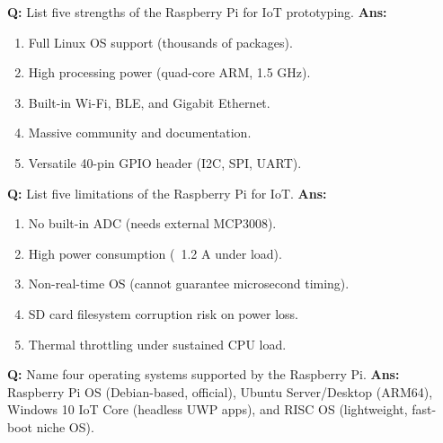 \documentclass[10pt,a4paper,twocolumn]{article}
\begin{document}
\begin{tcolorbox}[
  colback=white,
  colframe=UnitColorSix,
  colbacktitle=gray!10!white,
  coltitle=black,
  fonttitle=\bfseries\sffamily\small,
  title={Unit VI $\bullet$ Card 4},
  boxrule=1.2pt,
  arc=2mm,
  outer arc=2mm,
  boxsep=1.5mm,
  top=1mm,
  bottom=1mm,
  left=1.5mm,
  right=1.5mm,
  before skip=2.5mm,
  after skip=2.5mm
]
\textbf{Q:} List five strengths of the Raspberry Pi for IoT prototyping.
\tcbline
\textbf{Ans:} \begin{enumerate}
  \item Full Linux OS support (thousands of packages).
  \item High processing power (quad-core ARM, 1.5 GHz).
  \item Built-in Wi-Fi, BLE, and Gigabit Ethernet.
  \item Massive community and documentation.
  \item Versatile 40-pin GPIO header (I2C, SPI, UART).
\end{enumerate}
\end{tcolorbox}


\begin{tcolorbox}[
  colback=white,
  colframe=UnitColorSix,
  colbacktitle=gray!10!white,
  coltitle=black,
  fonttitle=\bfseries\sffamily\small,
  title={Unit VI $\bullet$ Card 5},
  boxrule=1.2pt,
  arc=2mm,
  outer arc=2mm,
  boxsep=1.5mm,
  top=1mm,
  bottom=1mm,
  left=1.5mm,
  right=1.5mm,
  before skip=2.5mm,
  after skip=2.5mm
]
\textbf{Q:} List five limitations of the Raspberry Pi for IoT.
\tcbline
\textbf{Ans:} \begin{enumerate}
  \item No built-in ADC (needs external MCP3008).
  \item High power consumption (~1.2 A under load).
  \item Non-real-time OS (cannot guarantee microsecond timing).
  \item SD card filesystem corruption risk on power loss.
  \item Thermal throttling under sustained CPU load.
\end{enumerate}
\end{tcolorbox}


\begin{tcolorbox}[
  colback=white,
  colframe=UnitColorSix,
  colbacktitle=gray!10!white,
  coltitle=black,
  fonttitle=\bfseries\sffamily\small,
  title={Unit VI $\bullet$ Card 6},
  boxrule=1.2pt,
  arc=2mm,
  outer arc=2mm,
  boxsep=1.5mm,
  top=1mm,
  bottom=1mm,
  left=1.5mm,
  right=1.5mm,
  before skip=2.5mm,
  after skip=2.5mm
]
\textbf{Q:} Name four operating systems supported by the Raspberry Pi.
\tcbline
\textbf{Ans:} Raspberry Pi OS (Debian-based, official), Ubuntu Server/Desktop (ARM64), Windows 10 IoT Core (headless UWP apps), and RISC OS (lightweight, fast-boot niche OS).
\end{tcolorbox}
\end{document}
